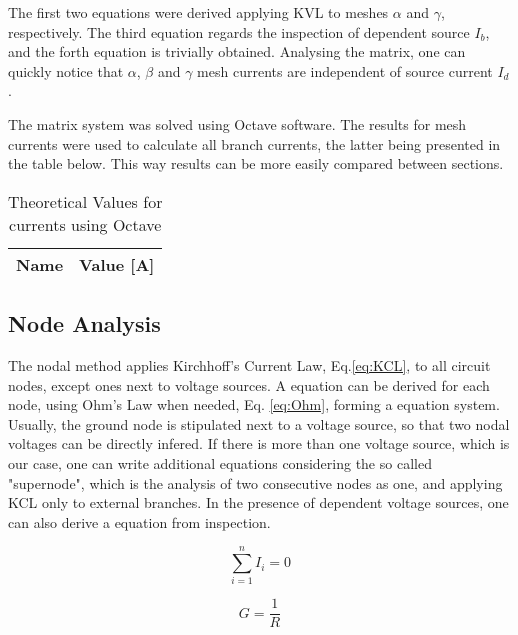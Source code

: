 \par The first two equations were derived applying KVL to meshes $\alpha$ and $\gamma$, respectively. The third equation regards the inspection of dependent source $I_b$, and the forth equation is trivially obtained.
Analysing the matrix, one can quickly notice that $\alpha$, $\beta$ and $\gamma$ mesh currents are independent of source current $I_d$.

\par The matrix system was solved using Octave software. The results for mesh currents were used to calculate all branch currents, the latter being presented in the table below. This way results can be more easily compared between sections.



\begin{table}[H]
  \centering
  \begin{tabular}{|l|r|}
    \hline
    {\bf Name} & {\bf Value [A]} \\ \hline
    
  \end{tabular}
  \caption{Theoretical Values for currents using Octave}
  \label{tab:TCurrents}
\end{table}

\subsection{Node Analysis}
\par The nodal method applies Kirchhoff's Current Law, Eq.\ref{eq:KCL}, to all circuit nodes, except ones next to voltage sources. A equation can be derived for each node, using Ohm's Law when needed, Eq. \ref{eq:Ohm}, forming a equation system. Usually, the ground node is stipulated next to a voltage source, so that two nodal voltages can be directly infered. If there is more than one voltage source, which is our case, one can write additional equations considering the so called "supernode", which is the analysis of two consecutive nodes as one, and applying KCL only to external branches. In the presence of dependent voltage sources, one can also derive a equation from inspection.
\begin{multicols}{2}
\begin{equation}
    \sum_{i=1}^{n} I_i = 0
    \label{eq:KCL}
\end{equation}

\begin{equation}
    G = \frac{1}{R}
    \label{eq:G}
\end{equation}
\end{multicols}

